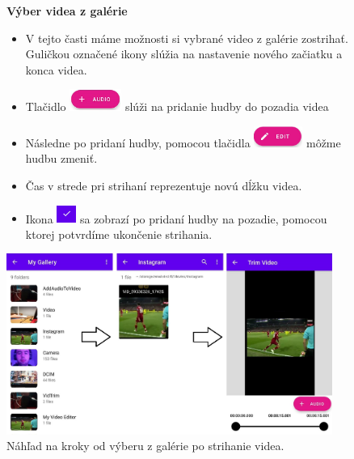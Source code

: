 \documentclass[12pt, oneside]{book}
\begin{document}
\begin{figure}[H]

    \hspace{15pt} \textbf{Výber videa z galérie}

 \begin{itemize}
        \item  V tejto časti máme možnosti si vybrané video z galérie zostrihať. Guličkou označené ikony slúžia na nastavenie nového začiatku a konca videa. 
        \item Tlačidlo  \includegraphics[width=0.16\textwidth]{images/audio plus.png} slúži na pridanie hudby do pozadia videa
        
        \item Následne po pridaní hudby, pomocou tlačidla \includegraphics[width=0.15\textwidth]{images/edit.jpg} môžme hudbu zmeniť.
        
        \item Čas v strede pri strihaní reprezentuje novú dĺžku videa.
        
        \item Ikona \includegraphics[width=0.06\textwidth]{images/fajka.jpg} sa zobrazí po pridaní hudby na pozadie, pomocou ktorej potvrdíme ukončenie strihania.
     
    \end{itemize} 
   
    \vspace{25pt}
    
  \includegraphics[width=0.95\textwidth]{images/trim.jpg}
    \caption{Náhľad na kroky od výberu z galérie po strihanie videa. }
    \label{fig:obr13}
\end{figure}
\end{document}
